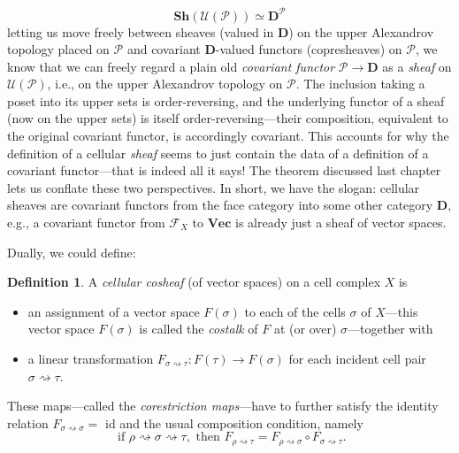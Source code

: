 \documentclass[11pt]{book}
\theoremstyle{definition}
\theoremstyle{definition}
\newtheorem{definition}{Definition}[section]
\theoremstyle{definition}
\theoremstyle{theorem}
\theoremstyle{definition}
\begin{document}
\begin{equation*}
\textbf{Sh}(\mathcal{U}(\mathcal{P})) \simeq \textbf{D}^{\mathcal{P}}
\end{equation*} 
letting us move freely between sheaves (valued in $\textbf{D}$) on the upper Alexandrov topology placed on $\mathcal{P}$ and covariant $\textbf{D}$-valued functors (copresheaves) on $\mathcal{P}$, we know that we can freely regard a plain old \textit{covariant functor} $\mathcal{P} \rightarrow \textbf{D}$ as a \textit{sheaf} on $\mathcal{U}(\mathcal{P})$, i.e., on the upper Alexandrov topology on $\mathcal{P}$. The inclusion taking a poset into its upper sets is order-reversing, and the underlying functor of a sheaf (now on the upper sets) is itself order-reversing---their composition, equivalent to the original covariant functor, is accordingly covariant. This accounts for why the definition of a cellular \textit{sheaf} seems to just contain the data of a definition of a covariant functor---that is indeed all it says! The theorem discussed last chapter lets us conflate these two perspectives. In short, we have the slogan: cellular sheaves are covariant functors from the face category into some other category \textbf{D}, e.g., a covariant functor from $\mathcal{F}_X$ to $\textbf{Vec}$ is already just a sheaf of vector spaces. \par    
Dually, we could define: 
	\begin{definition}
		A \textit{cellular cosheaf} (of vector spaces) on a cell complex $X$ is 
		\begin{itemize}
			\item an assignment of a vector space $F(\sigma)$ to each of the cells $\sigma$ of $X$---this vector space $F(\sigma)$ is called the \textit{costalk} of $F$ at (or over) $\sigma$---together with 
			\item a linear transformation $F_{\sigma \rightsquigarrow \tau}: F(\tau) \rightarrow F(\sigma)$ for each incident cell pair $\sigma \rightsquigarrow \tau$. 
		\end{itemize}
		These maps---called the \textit{corestriction maps}---have to further satisfy the identity relation $F_{\sigma \rightsquigarrow \sigma} = $ id and the usual composition condition, namely
		\begin{equation*}
		\text{ if } \rho \rightsquigarrow \sigma \rightsquigarrow \tau , \text{ then } F_{\rho \rightsquigarrow \tau} = F_{\rho \rightsquigarrow \sigma} \circ F_{\sigma \rightsquigarrow \tau}. 
		\end{equation*}
	\end{definition}
\end{document}
